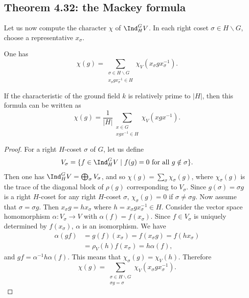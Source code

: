 \subsection*{Theorem 4.32: the Mackey formula}
Let us now compute the character $\chi$ of $\Ind_H^G V$. In each right coset $\sigma\in H\backslash G$, choose a representative $x_\sigma$.
\begin{theorem}[4.32]
One has
\[
\chi(g)=\sum_{\substack{\sigma\in H\backslash G\\x_\sigma gx_\sigma^{-1}\in H}}
\chi_V(x_\sigma gx_\sigma^{-1}).
\]
\end{theorem}
If the characteristic of the ground field $k$ is relatively prime to $|H|$, then this formula can be written as
\[
\chi(g)=\frac1{|H|}\sum_{\substack{x\in G\\xgx^{-1}\in H}}\chi_V(xgx^{-1}).
\]
\begin{proof}
For a right $H$-coset $\sigma$ of $G$, let us define
\[
V_\sigma=\{f\in\Ind_H^G V\mid f(g)=0\text{ for all }g\notin\sigma\}.
\]
Then one has $\Ind_H^G V=\bigoplus_\sigma V_\sigma$, and so
$\chi(g)=\sum_\sigma\chi_\sigma(g)$, where $\chi_\sigma(g)$ is the trace of the diagonal block of $\rho(g)$ corresponding to $V_\sigma$.
Since $g(\sigma)=\sigma g$ is a right $H$-coset for any right $H$-coset $\sigma$, $\chi_\sigma(g)=0$ if $\sigma\ne\sigma g$.
Now assume that $\sigma=\sigma g$. Then $x_\sigma g=hx_\sigma$ where $h=x_\sigma gx_\sigma^{-1}\in H$.
Consider the vector space homomorphism $\alpha:V_\sigma\to V$ with $\alpha(f)=f(x_\sigma)$. Since $f\in V_\sigma$ is uniquely determined by $f(x_\sigma)$, $\alpha$ is an isomorphism. We have
\begin{align*}
\alpha(gf)&=g(f)(x_\sigma)=f(x_\sigma g)=f(hx_\sigma)\\
&=\rho_V(h)f(x_\sigma)=h\alpha(f),
\end{align*}
and $gf=\alpha^{-1}h\alpha(f)$. This means that $\chi_\sigma(g)=\chi_V(h)$. Therefore
\[
\chi(g)=\sum_{\substack{\sigma\in H\backslash G\\\sigma g=\sigma}}\chi_V(x_\sigma gx_\sigma^{-1}).
\]
\end{proof}

